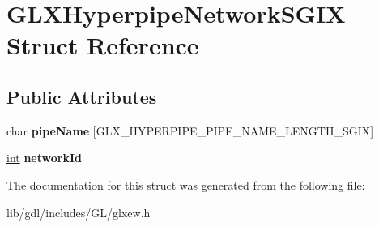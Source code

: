 \hypertarget{struct_g_l_x_hyperpipe_network_s_g_i_x}{}\section{G\+L\+X\+Hyperpipe\+Network\+S\+G\+I\+X Struct Reference}
\label{struct_g_l_x_hyperpipe_network_s_g_i_x}
\subsection*{Public Attributes}
\begin{DoxyCompactItemize}
\item 
\hypertarget{struct_g_l_x_hyperpipe_network_s_g_i_x_a6338b9717fa895aec16b932f2ef693ed}{}char {\bfseries pipe\+Name} \mbox{[}G\+L\+X\+\_\+\+H\+Y\+P\+E\+R\+P\+I\+P\+E\+\_\+\+P\+I\+P\+E\+\_\+\+N\+A\+M\+E\+\_\+\+L\+E\+N\+G\+T\+H\+\_\+\+S\+G\+I\+X\mbox{]}\label{struct_g_l_x_hyperpipe_network_s_g_i_x_a6338b9717fa895aec16b932f2ef693ed}

\item 
\hypertarget{struct_g_l_x_hyperpipe_network_s_g_i_x_a81393053988b32fadb0b21615024add1}{}\hyperlink{_s_d_l__thread_8h_a6a64f9be4433e4de6e2f2f548cf3c08e}{int} {\bfseries network\+Id}\label{struct_g_l_x_hyperpipe_network_s_g_i_x_a81393053988b32fadb0b21615024add1}

\end{DoxyCompactItemize}


The documentation for this struct was generated from the following file\+:\begin{DoxyCompactItemize}
\item 
lib/gdl/includes/\+G\+L/glxew.\+h\end{DoxyCompactItemize}
